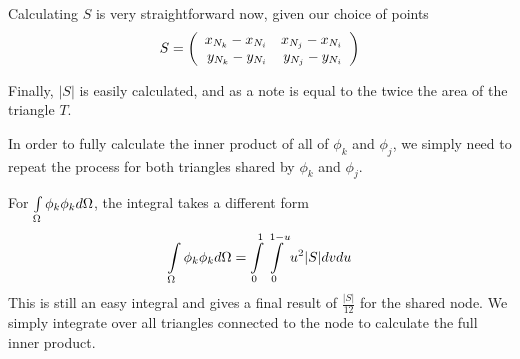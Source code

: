 Calculating $S$ is very straightforward now, given our choice of points
\begin{equation}
S = \left(\begin{array}{rrrrrr} 
    x_{N_k} - x_{N_i} & x_{N_j} - x_{N_i} \\ 
    y_{N_k} - y_{N_i} & y_{N_j} - y_{N_i}
 \\ \end{array} \right)
\end{equation}

Finally, $|S|$ is easily calculated, and as a note is equal to the twice the area of
the triangle $T$.

In order to fully calculate the inner product of all of $\phi_k$ and $\phi_j$, we simply need to repeat the process
for both triangles shared by $\phi_k$ and $\phi_j$.

For $\int\limits_{\Omega} \phi_k \phi_k d\Omega$, the integral takes a different form
\begin{equation}
\int\limits_{\Omega} \phi_k \phi_k d\Omega = \int\limits_0^1 \int\limits_0^{1-u} u^2 |S| dv du
\end{equation}
This is still an easy integral and gives a final result of $\frac{|S|}{12}$ for the shared node. We simply integrate
over all triangles connected to the node to calculate the full inner product.
